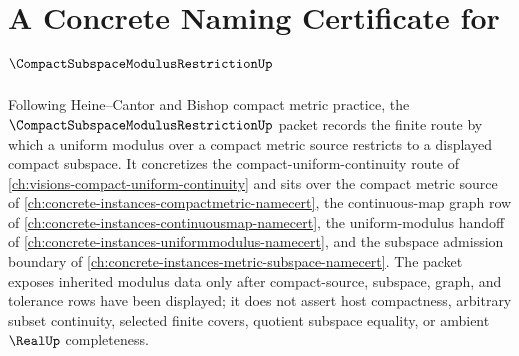 \chapter{A Concrete Naming Certificate for $\CompactSubspaceModulusRestrictionUp$}
\label{ch:concrete-instances-compact-subspace-modulus-restriction-namecert}

Following Heine--Cantor and Bishop compact metric practice, the $\CompactSubspaceModulusRestrictionUp$ packet records the finite route by which a uniform modulus over a compact metric source restricts to a displayed compact subspace. It concretizes the compact-uniform-continuity route of \autoref{ch:visions-compact-uniform-continuity} and sits over the compact metric source of \autoref{ch:concrete-instances-compactmetric-namecert}, the continuous-map graph row of \autoref{ch:concrete-instances-continuousmap-namecert}, the uniform-modulus handoff of \autoref{ch:concrete-instances-uniformmodulus-namecert}, and the subspace admission boundary of \autoref{ch:concrete-instances-metric-subspace-namecert}. The packet exposes inherited modulus data only after compact-source, subspace, graph, and tolerance rows have been displayed; it does not assert host compactness, arbitrary subset continuity, selected finite covers, quotient subspace equality, or ambient $\RealUp$ completeness.

